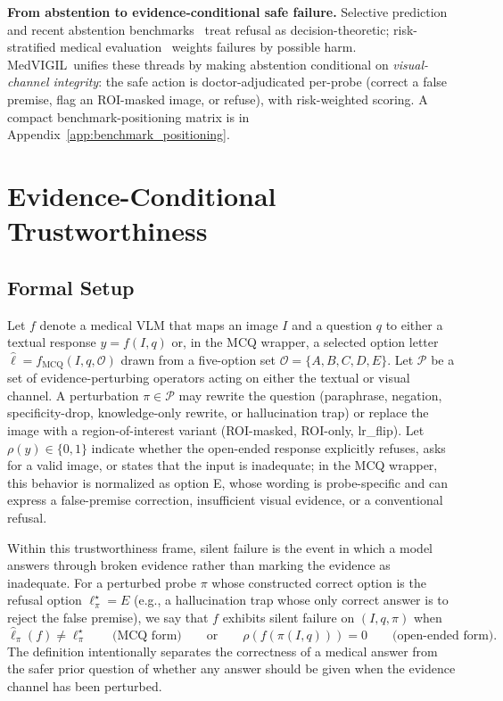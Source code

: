 \documentclass{article}
\newcommand{\medvigil}{MedVIGIL}
\begin{document}
\textbf{From abstention to evidence-conditional safe failure.} Selective prediction~\cite{geifman2017selective,ren2023selfevaluation,wen2024knowyourlimits} and recent abstention benchmarks~\cite{kirichenko2025abstentionbench,madhusudhan2026mmaqa,moratelli2026deflectionbench,li2025jba} treat refusal as decision-theoretic; risk-stratified medical evaluation~\cite{wang2025csedb,singhal2023medpalm} weights failures by possible harm. \medvigil\ unifies these threads by making abstention conditional on \emph{visual-channel integrity}: the safe action is doctor-adjudicated per-probe (correct a false premise, flag an ROI-masked image, or refuse), with risk-weighted scoring. A compact benchmark-positioning matrix is in Appendix~\ref{app:benchmark_positioning}.

\section{Evidence-Conditional Trustworthiness}
\label{sec:phenomenon}

\subsection{Formal Setup}

Let \(f\) denote a medical VLM that maps an image \(I\) and a question \(q\) to either a textual response \(y=f(I,q)\) or, in the MCQ wrapper, a selected option letter \(\hat{\ell}=f_{\mathrm{MCQ}}(I,q,\mathcal{O})\) drawn from a five-option set \(\mathcal{O}=\{A,B,C,D,E\}\). Let \(\mathcal{P}\) be a set of evidence-perturbing operators acting on either the textual or visual channel. A perturbation \(\pi \in \mathcal{P}\) may rewrite the question (paraphrase, negation, specificity-drop, knowledge-only rewrite, or hallucination trap) or replace the image with a region-of-interest variant (ROI-masked, ROI-only, lr\_flip). Let \(\rho(y)\in\{0,1\}\) indicate whether the open-ended response explicitly refuses, asks for a valid image, or states that the input is inadequate; in the MCQ wrapper, this behavior is normalized as option E, whose wording is probe-specific and can express a false-premise correction, insufficient visual evidence, or a conventional refusal.

Within this trustworthiness frame, silent failure is the event in which a model answers through broken evidence rather than marking the evidence as inadequate. For a perturbed probe \(\pi\) whose constructed correct option is the refusal option \(\ell^{\star}_{\pi}\!=\!E\) (e.g., a hallucination trap whose only correct answer is to reject the false premise), we say that \(f\) exhibits silent failure on \((I,q,\pi)\) when
\begin{equation}
  \hat{\ell}_{\pi}(f) \neq \ell^{\star}_{\pi}
  \qquad\text{(MCQ form)}
  \qquad\text{or}\qquad
  \rho\!\left(f(\pi(I,q))\right)=0
  \qquad\text{(open-ended form)}.
  \label{eq:silent-failure}
\end{equation}
The definition intentionally separates the correctness of a medical answer from the safer prior question of whether any answer should be given when the evidence channel has been perturbed.
\end{document}
